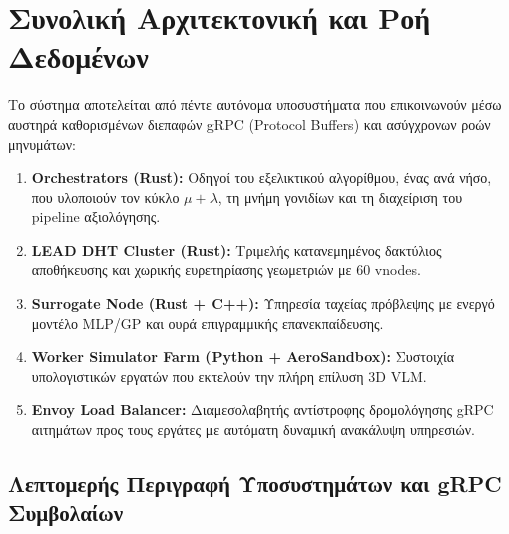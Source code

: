 \section{Συνολική Αρχιτεκτονική και Ροή Δεδομένων}
\label{sec:arch_overview}

Το σύστημα αποτελείται από πέντε αυτόνομα υποσυστήματα που επικοινωνούν μέσω αυστηρά καθορισμένων διεπαφών gRPC (Protocol Buffers) και ασύγχρονων ροών μηνυμάτων:
\begin{enumerate}
    \item \textbf{Orchestrators (Rust):} Οδηγοί του εξελικτικού αλγορίθμου, ένας ανά νήσο, που υλοποιούν τον κύκλο $\mu + \lambda$, τη μνήμη γονιδίων και τη διαχείριση του pipeline αξιολόγησης.
    \item \textbf{LEAD DHT Cluster (Rust):} Τριμελής κατανεμημένος δακτύλιος αποθήκευσης και χωρικής ευρετηρίασης γεωμετριών με 60 vnodes.
    \item \textbf{Surrogate Node (Rust + C++):} Υπηρεσία ταχείας πρόβλεψης με ενεργό μοντέλο MLP/GP και ουρά επιγραμμικής επανεκπαίδευσης.
    \item \textbf{Worker Simulator Farm (Python + AeroSandbox):} Συστοιχία υπολογιστικών εργατών που εκτελούν την πλήρη επίλυση 3D VLM.
    \item \textbf{Envoy Load Balancer:} Διαμεσολαβητής αντίστροφης δρομολόγησης gRPC αιτημάτων προς τους εργάτες με αυτόματη δυναμική ανακάλυψη υπηρεσιών.
\end{enumerate}

\subsection*{Λεπτομερής Περιγραφή Υποσυστημάτων και gRPC Συμβολαίων}

